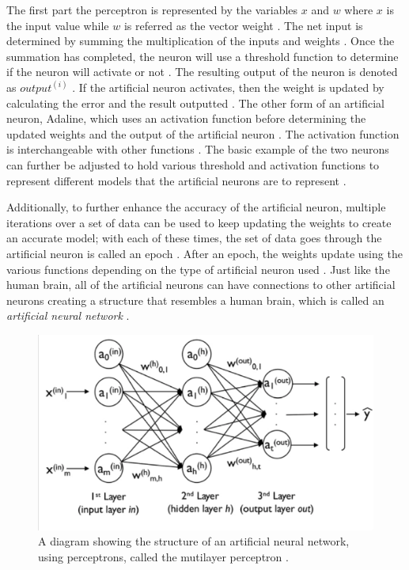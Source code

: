 \documentclass[a4paper, 12pt]{article}
\begin{document}
\begin{paragraph}
\indent The first part the perceptron is represented by the variables \(x\) and \(w\) where \(x\) is the input value while \(w\) is referred as the vector weight \cite{pythonML}. The net input is determined by summing the multiplication of the inputs and weights \cite{pythonML}. Once the summation has completed, the neuron will use a threshold function to determine if the neuron will activate or not \cite{pythonML}. The resulting output of the neuron is denoted as \( output^{(i)} \) \cite{pythonML}. If the artificial neuron activates, then the weight is updated by calculating the error and the result outputted \cite{pythonML}. The other form of an artificial neuron, Adaline, which uses an activation function before determining the updated weights and the output of the artificial neuron \cite{pythonML}. The activation function is interchangeable with other functions \cite{pythonML}. The basic example of the two neurons can further be adjusted to hold various threshold and activation functions to represent different models that the artificial neurons are to represent \cite{pythonML}.
\par
\indent Additionally, to further enhance the accuracy of the artificial neuron, multiple iterations over a set of data can be used to keep updating the weights to create an accurate model; with each of these times, the set of data goes through the artificial neuron is called an epoch \cite{pythonML}. After an epoch, the weights update using the various functions depending on the type of artificial neuron used \cite{pythonML}. Just like the human brain, all of the artificial neurons can have connections to other artificial neurons creating a structure that resembles a human brain, which is called an  \textit{ artificial neural network} \cite{pythonML}.
\par

\begin{figure}[!h]
\centering
\includegraphics[scale=0.63]{NN}
\caption{A diagram showing the structure of an artificial neural network, using perceptrons, called the mutilayer perceptron \cite{pythonML}.}
\end{figure}


\end{paragraph}
\end{document}
